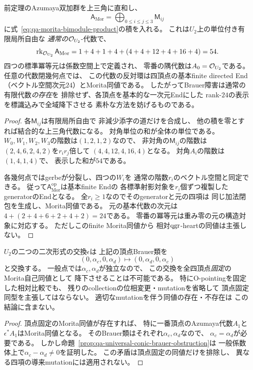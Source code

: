 \begin{corollary}[階数五十四の相対有限代数とpointed頂点]
\label{cor:qa-morita-rank54}
前定理のAzumaya双加群を上三角に直和し、
\[
 \mathsf A_{\mathrm{Mor}}
   =\bigoplus_{0\le i\le j\le3}\mathsf M_{ij}
\]
に式~\eqref{eq:qa-morita-bimodule-product}の積を入れる。
これは$U_2$上の単位付き有限局所自由な
\emph{通常の}$\mathcal O_{U_2}$-代数で、
\begin{equation}
 \operatorname{rk}_{\mathcal O_{U_2}}\mathsf A_{\mathrm{Mor}}
 =1+4+1+4+
   (4+4+12+4+16+4)=54.
 \label{eq:qa-morita-rank54}
\end{equation}
四つの標準冪等元は係数空間上で定義され、
零番の隅代数は$A_0=\mathcal O_{U_2}$である。
任意の代数閉幾何点では、
この代数の反対環は四頂点の基本finite directed End
（ベクトル空間次元$24$）とMorita同値である。
したがってBrauer障害は通常の有限代数\emph{の存在}を
排除せず、各頂点を基本的な一次元Endにした
rank-$24$の表示を標識込みで全域降下させる
素朴な方法を妨げるものである。
\end{corollary}
\begin{proof}
各$\mathsf M_{ij}$は有限局所自由で
非減少添字の道だけを合成し、
他の積を零とすれば結合的な上三角代数になる。
対角単位の和が全体の単位である。
$W_0,W_1,W_2,W_3$の階数は$(1,2,1,2)$なので、
非対角の$\mathsf M_{ij}$の階数は
$(2,4,6,2,4,2)$を$r_ir_j$倍して
$(4,4,12,4,16,4)$となる。
対角$A_i$の階数は$(1,4,1,4)$で、
表示した和が$54$である。

各幾何点ではgerbeが分裂し、四つの$W_i$を
通常の階数$r_i$のベクトル空間と同定できる。
従って$\mathsf A_{\mathrm{Mor}}^{\mathrm{op}}$は基本finite Endの
各標準射影対象を$r_i$個ずつ複製したgeneratorのEndとなる。
全$r_i\ge1$なのでそのgeneratorと元の四項は
同じ加法閉包を生成し、Morita同値である。
元の基本代数の次元は
$4+(2+4+6+2+4+2)=24$である。
零番の冪等元は重み零の元の構造対象に対応する。
ただしこのfinite Morita同値から
相対$\operatorname{qgr}$-heartの同値は主張しない。
\end{proof}

\begin{corollary}[ruling交換の頂点固定Morita降下は不可能]
\label{cor:qa-morita-ruling-exchange-phase}
$U_2$の二つの二次形式の交換$\epsilon$は
上記の頂点Brauer類を
\[
 (0,\alpha_c,0,\alpha_d)
   \longmapsto(0,\alpha_d,0,\alpha_c)
\]
と交換する。
一般点では$\alpha_c,\alpha_d$が独立なので、
この交換を全四頂点\emph{固定}のMorita自己同値として
降下させることは不可能である。
特にO-pointingを固定した相対比較でも、
残りのcollectionの位相変更・mutationを省略して
頂点固定同型を主張してはならない。
適切なmutationを伴う同値の存在・不存在は
この結論に含まない。
\end{corollary}
\begin{proof}
頂点固定のMorita同値が存在すれば、
特に一番頂点のAzumaya代数$A_1$と
$\epsilon^*A_1$はMorita同値となる。
そのBrauer類はそれぞれ$\alpha_c,\alpha_d$なので、
$\alpha_c=\alpha_d$が必要である。
しかし命題~\ref{prop:qa-universal-conic-brauer-obstruction}は
一般係数体上で$\alpha_c-\alpha_d\ne0$を証明した。
この矛盾は頂点固定の同値だけを排除し、
異なる四項の導来mutationには適用されない。
\end{proof}
